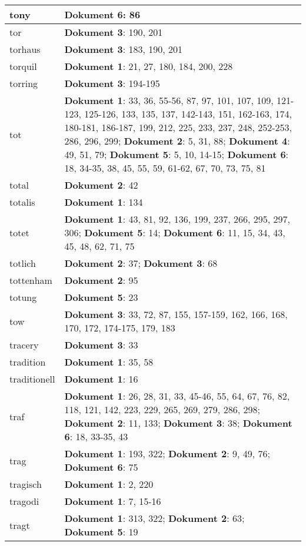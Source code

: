 \documentclass[a5paper]{article}
\begin{document}
\begin{longtable}[l]{|l|p{3in}|}
\hline
tony & \textbf{Dokument 6}: 86 \\
\hline
tor & \textbf{Dokument 3}: 190, 201 \\
\hline
torhaus & \textbf{Dokument 3}: 183, 190, 201 \\
\hline
torquil & \textbf{Dokument 1}: 21, 27, 180, 184, 200, 228 \\
\hline
torring & \textbf{Dokument 3}: 194-195 \\
\hline
tot & \textbf{Dokument 1}: 33, 36, 55-56, 87, 97, 101, 107, 109, 121-123, 125-126, 133, 135, 137, 142-143, 151, 162-163, 174, 180-181, 186-187, 199, 212, 225, 233, 237, 248, 252-253, 286, 296, 299; \textbf{Dokument 2}: 5, 31, 88; \textbf{Dokument 4}: 49, 51, 79; \textbf{Dokument 5}: 5, 10, 14-15; \textbf{Dokument 6}: 18, 34-35, 38, 45, 55, 59, 61-62, 67, 70, 73, 75, 81 \\
\hline
total & \textbf{Dokument 2}: 42 \\
\hline
totalis & \textbf{Dokument 1}: 134 \\
\hline
totet & \textbf{Dokument 1}: 43, 81, 92, 136, 199, 237, 266, 295, 297, 306; \textbf{Dokument 5}: 14; \textbf{Dokument 6}: 11, 15, 34, 43, 45, 48, 62, 71, 75 \\
\hline
totlich & \textbf{Dokument 2}: 37; \textbf{Dokument 3}: 68 \\
\hline
tottenham & \textbf{Dokument 2}: 95 \\
\hline
totung & \textbf{Dokument 5}: 23 \\
\hline
tow & \textbf{Dokument 3}: 33, 72, 87, 155, 157-159, 162, 166, 168, 170, 172, 174-175, 179, 183 \\
\hline
tracery & \textbf{Dokument 3}: 33 \\
\hline
tradition & \textbf{Dokument 1}: 35, 58 \\
\hline
traditionell & \textbf{Dokument 1}: 16 \\
\hline
traf & \textbf{Dokument 1}: 26, 28, 31, 33, 45-46, 55, 64, 67, 76, 82, 118, 121, 142, 223, 229, 265, 269, 279, 286, 298; \textbf{Dokument 2}: 11, 133; \textbf{Dokument 3}: 38; \textbf{Dokument 6}: 18, 33-35, 43 \\
\hline
trag & \textbf{Dokument 1}: 193, 322; \textbf{Dokument 2}: 9, 49, 76; \textbf{Dokument 6}: 75 \\
\hline
tragisch & \textbf{Dokument 1}: 2, 220 \\
\hline
tragodi & \textbf{Dokument 1}: 7, 15-16 \\
\hline
tragt & \textbf{Dokument 1}: 313, 322; \textbf{Dokument 2}: 63; \textbf{Dokument 5}: 19 \\

\end{longtable}
\end{document}
